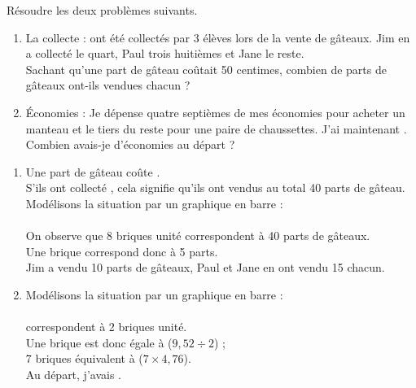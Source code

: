 \begin{exercice*}
   Résoudre les deux problèmes suivants.
   \begin{enumerate}
      \item La collecte :  ont été collectés par 3 élèves lors de la vente de gâteaux. Jim en  a collecté le quart, Paul trois huitièmes et Jane le reste. \\
         Sachant qu’une part de gâteau coûtait 50 centimes, combien de parts de gâteaux ont-ils vendues chacun ?
       \item Économies : Je dépense quatre septièmes de mes économies pour acheter un manteau et le tiers du reste pour une paire de chaussettes. J’ai maintenant . \\
          Combien avais-je d’économies au départ ?
   \end{enumerate}
\end{exercice*}
\begin{corrige}
   \begin{enumerate}
      \item Une part de gâteau coûte . \\
         S'ils ont collecté , cela signifie qu'ils ont vendus au total 40 parts de gâteau. \\
         Modélisons la situation par un graphique en barre : \\ [1mm]
          \\
         On observe que 8 briques unité correspondent à 40 parts de gâteaux. \\
         Une brique correspond donc à 5 parts. \\
         {\red Jim a vendu 10 parts de gâteaux, Paul et Jane en ont vendu 15 chacun}.
      \item Modélisons la situation par un graphique en barre : \\ [1mm]
          \\
          correspondent à 2 briques unité. \\
         Une brique est donc égale à  ($9,52\div2$) ; \\
         7 briques équivalent à  ($7\times4,76$). \\
         {\red Au départ, j'avais .}
   \end{enumerate}
\end{corrige}
